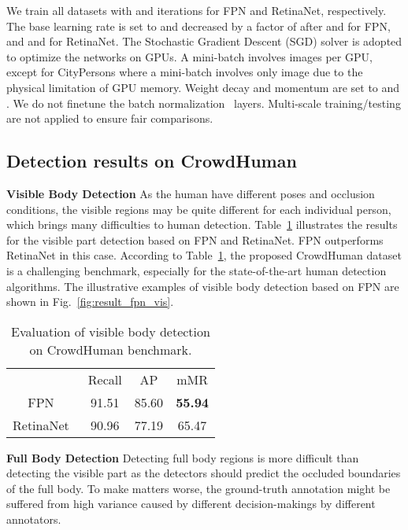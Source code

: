 \documentclass[10pt,twocolumn,letterpaper]{article}
\newcommand{\myparagraph}[1]{{\vspace{0.5em} \noindent \bf #1}}
\begin{document}
We train all datasets with  and  iterations for FPN and RetinaNet, respectively. The base learning rate is set to  and decreased by a factor of  after  and  for FPN, and  and  for RetinaNet. The Stochastic Gradient Descent (SGD) solver is adopted to optimize the networks on  GPUs. A mini-batch involves  images per GPU, except for CityPersons where a mini-batch involves only  image due to the physical limitation of GPU memory. Weight decay and momentum are set to  and . We do not finetune the batch normalization~\cite{ioffe2015batch} layers. Multi-scale training/testing are not applied to ensure fair comparisons. 


\subsection{Detection results on CrowdHuman}
\label{sec:expCrowdhuman}

\myparagraph{Visible Body Detection} As the human have different poses and occlusion conditions, the visible regions may be quite different for each individual person, which brings many difficulties to human detection. Table~\ref{table:evalvis} illustrates the results for the visible part detection based on FPN and RetinaNet. FPN outperforms RetinaNet in this case. According to Table~\ref{table:evalvis}, the proposed CrowdHuman dataset is a challenging benchmark, especially for the state-of-the-art human detection algorithms. The illustrative examples of visible body detection based on FPN are shown in Fig.~\ref{fig:result_fpn_vis}.

\setlength{\tabcolsep}{4pt}
\begin{table}
\begin{center}
\caption{Evaluation of visible body detection on CrowdHuman benchmark.}
\label{table:evalvis}
\begin{tabular}{cccc}
\hline\noalign{\smallskip}
{} & Recall & AP & mMR\\
\noalign{\smallskip}
\hline
\noalign{\smallskip}
FPN~\cite{lin2017feature}  & {91.51} & {85.60} & {\textbf{55.94}}\\
RetinaNet~\cite{lin2017focal} & {90.96} & {77.19} & {65.47}\\
\hline
\end{tabular}
\end{center}
\end{table}
\setlength{\tabcolsep}{1.4pt}


\myparagraph{Full Body Detection} Detecting full body regions is more difficult than detecting the visible part as the detectors should predict the occluded boundaries of the full body. To make matters worse, the ground-truth annotation might be suffered from high variance caused by different decision-makings by different annotators.
\end{document}
